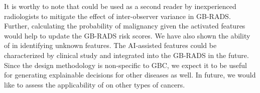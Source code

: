 %
\par It is worthy to note that \radformer could be used as a second reader by inexperienced radiologists to mitigate the effect of inter-observer variance in GB-RADS. Further, calculating the probability of malignancy given the activated features would help to update the GB-RADS risk scores. We have also shown the ability of \radformer in identifying unknown features. The AI-assisted features could be characterized by clinical study and integrated into the GB-RADS in the future. Since the \radformer design methodology is non-specific to GBC, we expect it to be useful for generating explainable decisions for other diseases as well. In future, we would like to assess the applicability of \radformer on other types of cancers.




